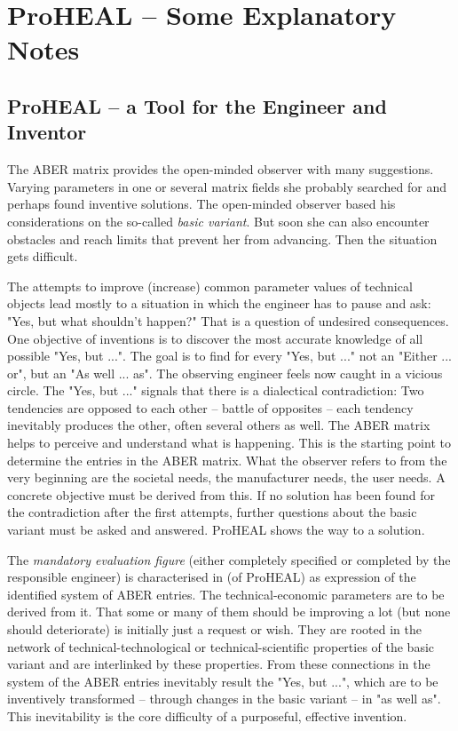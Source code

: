 \documentclass[11pt,a4paper]{article}
\begin{document}
\section{ProHEAL -- Some Explanatory Notes}

\subsection{ProHEAL -- a Tool for the Engineer and Inventor}

The ABER matrix provides the open-minded observer with many suggestions.
Varying parameters in one or several matrix fields she probably searched for
and perhaps found inventive solutions. The open-minded observer based his
considerations on the so-called \emph{basic variant}. But soon she can also
encounter obstacles and reach limits that prevent her from advancing. Then the
situation gets difficult.

The attempts to improve (increase) common parameter values of technical
objects lead mostly to a situation in which the engineer has to pause and ask:
"Yes, but what shouldn't happen?" That is a question of undesired
consequences.  One objective of inventions is to discover the most accurate
knowledge of all possible "Yes, but ...".  The goal is to find for every "Yes,
but ..."  not an "Either ... or", but an "As well ... as". The observing
engineer feels now caught in a vicious circle. The "Yes, but ..."  signals
that there is a dialectical contradiction: Two tendencies are opposed to each
other -- battle of opposites -- each tendency inevitably produces the other,
often several others as well. The ABER matrix helps to perceive and understand
what is happening. This is the starting point to determine the entries in the
ABER matrix. What the observer refers to from the very beginning are the
societal needs, the manufacturer needs, the user needs. A concrete objective
must be derived from this. If no solution has been found for the contradiction
after the first attempts, further questions about the basic variant must be
asked and answered. ProHEAL shows the way to a solution.

The \emph{mandatory evaluation figure} (either completely specified or
completed by the responsible engineer) is characterised in \cite[(1.3)]{RM-21}
(of ProHEAL) as expression of the identified system of ABER entries. The
technical-economic parameters are to be derived from it. That some or many of
them should be improving a lot (but none should deteriorate) is initially just
a request or wish. They are rooted in the network of technical-technological
or technical-scientific properties of the basic variant and are interlinked by
these properties. From these connections in the system of the ABER entries
inevitably result the "Yes, but ...", which are to be inventively transformed
-- through changes in the basic variant -- in "as well as". This inevitability
is the core difficulty of a purposeful, effective invention.
\end{document}
